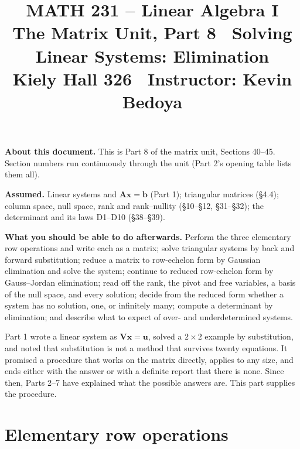 \documentclass[11pt]{article}
\title{\vspace{-1.2cm}\textbf{\sffamily MATH 231 -- Linear Algebra I}\\[4pt]
       {\large\sffamily The Matrix Unit, Part 8 \textbullet\ Solving Linear
        Systems: Elimination}\\[2pt]
       {\normalsize\sffamily Kiely Hall 326 \textbullet\
        Instructor: Kevin Bedoya}}
\author{}
\date{}
\theoremstyle{plain}
\theoremstyle{definition}
\theoremstyle{remark}
\newcommand{\vc}[1]{\mathbf{#1}}
\newcommand{\mt}[1]{\mathbf{#1}}
\begin{document}
\setcounter{section}{39}  %
\maketitle
\vspace{-1.6cm}

\noindent\textbf{About this document.} This is Part 8 of the matrix unit,
Sections 40--45. Section numbers run continuously through the unit (Part 2's
opening table lists them all).

\medskip
\noindent\textbf{Assumed.} Linear systems and $\mt{A}\vc{x}=\vc{b}$ (Part 1);
triangular matrices (\S4.4); column space, null space, rank and rank--nullity
(\S10--\S12, \S31--\S32); the determinant and its laws D1--D10 (\S38--\S39).

\medskip
\noindent\textbf{What you should be able to do afterwards.} Perform the three
elementary row operations and write each as a matrix; solve triangular systems
by back and forward substitution; reduce a matrix to row-echelon form by Gaussian
elimination and solve the system; continue to reduced row-echelon form by
Gauss--Jordan elimination; read off the rank, the pivot and free variables, a
basis of the null space, and every solution; decide from the reduced form whether
a system has no solution, one, or infinitely many; compute a determinant by
elimination; and describe what to expect of over- and underdetermined systems.

\bigskip
\noindent Part 1 wrote a linear system as $\mt{V}\vc{x}=\vc{u}$, solved a
$2\times2$ example by substitution, and noted that substitution is not a method
that survives twenty equations. It promised a procedure that works on the matrix
directly, applies to any size, and ends either with the answer or with a definite
report that there is none. Since then, Parts 2--7 have explained what the
possible answers are. This part supplies the procedure.

\section{Elementary row operations}

\end{document}
